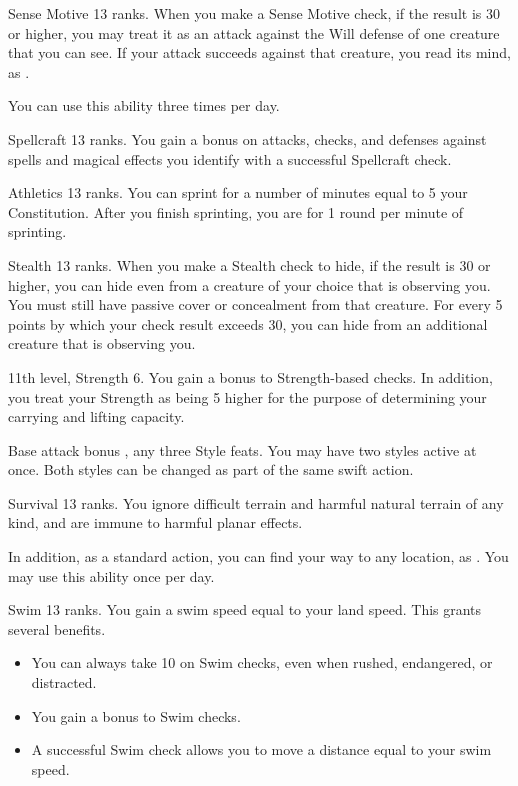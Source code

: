 \featpre Sense Motive 13 ranks.
\featben When you make a Sense Motive check, if the result is 30 or higher, you may treat it as an attack against the Will defense of one creature that you can see. If your attack succeeds against that creature, you read its mind, as .

You can use this ability three times per day.

\featpre Spellcraft 13 ranks.
\featben You gain a  bonus on attacks, checks, and defenses against spells and magical effects you identify with a successful Spellcraft check.

\featpre Athletics 13 ranks.
\featben You can sprint for a number of minutes equal to 5 \add your Constitution. After you finish sprinting, you are \fatigued for 1 round per minute of sprinting.

\featpre Stealth 13 ranks.
\featben When you make a Stealth check to hide, if the result is 30 or higher, you can hide even from a creature of your choice that is observing you. You must still have passive cover or concealment from that creature. For every 5 points by which your check result exceeds 30, you can hide from an additional creature that is observing you.

\featpre 11th level, Strength 6.
\featben You gain a  bonus to Strength-based checks. In addition, you treat your Strength as being 5 higher for the purpose of determining your carrying and lifting capacity.

\featpre Base attack bonus , any three Style feats.
\featben You may have two styles active at once. Both styles can be changed as part of the same swift action.

\featpre Survival 13 ranks.
\featben You ignore difficult terrain and harmful natural terrain of any kind, and are immune to harmful planar effects.

In addition, as a standard action, you can find your way to any location, as . You may use this ability once per day.

\featpre Swim 13 ranks.
\featben You gain a swim speed equal to your land speed. This grants several benefits.
\begin{itemize}
    \item You can always take 10 on Swim checks, even when rushed, endangered, or distracted.
    \item You gain a  bonus to Swim checks.
    \item A successful Swim check allows you to move a distance equal to your swim speed.
\end{itemize}


